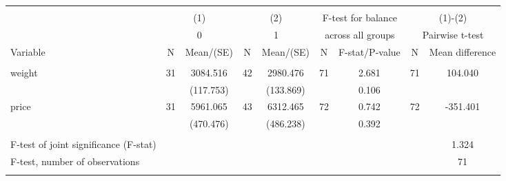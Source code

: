 
\begin{tabular}{@{\extracolsep{5pt}}lcccccccc}
\\[-1.8ex]\hline \hline \\[-1.8ex]
 & \multicolumn{2}{c}{(1)}  & \multicolumn{2}{c}{(2)}  & \multicolumn{2}{c}{F-test for balance} & \multicolumn{2}{c}{(1)-(2)} \\
 & \multicolumn{2}{c}{0}  & \multicolumn{2}{c}{1}  & \multicolumn{2}{c}{across all groups} & \multicolumn{2}{c}{Pairwise t-test}  \\
Variable & N & Mean/(SE) & N & Mean/(SE) & N & F-stat/P-value & N & Mean difference \\ \hline \\[-1.8ex] 
weight   & 31    & 3084.516    & 42    & 2980.476    & 71    & 2.681    & 71    & 104.040   \\
 &   & (117.753)  &   & (133.869)  &   & 0.106  &   &  \\ [1ex]
price   & 31    & 5961.065    & 43    & 6312.465    & 72    & 0.742    & 72    & -351.401   \\
 &   & (470.476)  &   & (486.238)  &   & 0.392  &   &  \\ [1ex]
\hline \\[-1.8ex]
F-test of joint significance (F-stat) & &   & &   & &     & &  1.324  \\
F-test, number of observations & &   & &   & &   & &  71  \\
\hline \hline \\[-1.8ex]

\end{tabular}
